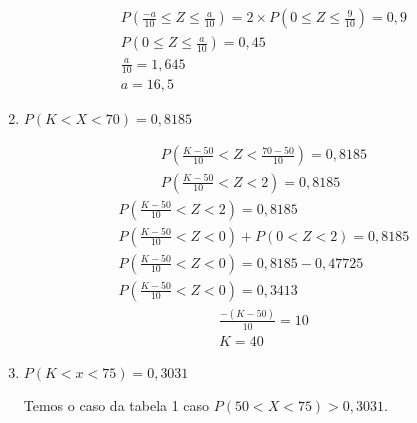 \begin{example}
\begin{enumerate}[label=(\alph*)]
              \begin{figure}[H]
                \centering
                
                \label{fig:}
              \end{figure}

              \begin{align*}
                P( \frac{-a}{10} \leq Z \leq \frac{a}{10} ) = 2 \times P(0 \leq Z \leq \frac{9}{10})= 0,9 \\
                P(0 \leq Z \leq \frac{a}{10})=0,45 \\
                \frac{a}{10}= 1,645 \\
                a = 16,5
              \end{align*}
            \item $P(K< X <70)=0,8185$
              \begin{figure}[H]
                \centering
                
                \label{fig:}
              \end{figure}


              \begin{align*}
                P( \frac{K-50}{10} < Z < \frac{70-50}{10} ) = 0,8185 \\
                P(\frac{K-50}{10} < Z < 2) =0,8185
              \end{align*}
              \begin{align*}
                P( \frac{K-50}{10}<Z<2 )  = 0,8185 \\
                P( \frac{K-50}{10} < Z <0) + P(0 < Z <2) =0,8185 \\
                P(\frac{K-50}{10}<Z < 0) = 0,8185 - 0,47725 \\
                P( \frac{K-50}{10} < Z < 0 ) =0,3413
              \end{align*}
              \begin{align*}
                \frac{-(K-50)}{10} = 10 \\
                K= 40
              \end{align*}
            \item $P(K < x <75)= 0,3031$

              Temos o caso da tabela 1 caso $P(50 < X < 75) > 0,3031$.


\end{enumerate}
\end{example}
